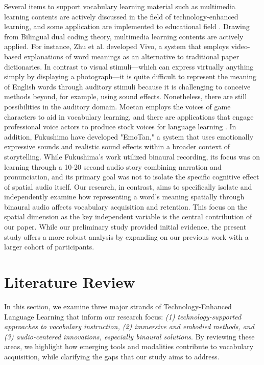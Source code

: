 \documentclass{ehissymp}
\begin{document}
Several items to support vocabulary learning material such as multimedia learning contents are actively discussed in the field of technology-enhanced learning, and some application are implemented to educational field \cite{cakici2016,Miura2023}. Drawing from Bilingual dual coding theory, multimedia learning contents are actively applied. For instance, Zhu et al. developed Vivo, a system that employs video-based explanations of word meanings as an alternative to traditional paper dictionaries\cite{Zhu2017}. In contrast to visual stimuli—which can express virtually anything simply by displaying a photograph—it is quite difficult to represent the meaning of English words through auditory stimuli because it is challenging to conceive methods beyond, for example, using sound effects. Nonetheless, there are still possibilities in the auditory domain. Moetan employs the voices of game characters to aid in vocabulary learning\cite{moetan2008}, and there are applications that engage professional voice actors to produce stock voices for language learning \cite{Hiroshi2014,Ogura2014}. In addition, Fukushima\cite{Fukushima2019} have developed "EmoTan," a system that uses emotionally expressive sounds and realistic sound effects within a broader context of storytelling. While Fukushima's\cite{Fukushima2019} work utilized binaural recording, its focus was on learning through a 10-20 second audio story combining narration and pronunciation, and its primary goal was not to isolate the specific cognitive effect of spatial audio itself. Our research, in contrast, aims to specifically isolate and independently examine how representing a word's meaning spatially through binaural audio affects vocabulary acquisition and retention. This focus on the spatial dimension as the key independent variable is the central contribution of our paper.  While our preliminary study \cite{shimizu2022} provided initial evidence, the present study offers a more robust analysis by expanding on our previous work with a larger cohort of participants.

\section{Literature Review}
In this section, we examine three major strands of Technology-Enhanced Language Learning that inform our research focus:
\emph{(1) technology-supported approaches to vocabulary instruction, (2) immersive and embodied methods, and (3) audio-centered innovations, especially binaural solutions}.
By reviewing these areas, we highlight how emerging tools and modalities contribute to vocabulary acquisition, while clarifying the gaps that our study aims to address.
\end{document}
